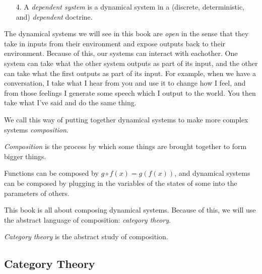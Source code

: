 \documentclass[DynamicalBook]{subfiles}
\begin{document}
\begin{enumerate}
  \item[4.] A \emph{dependent system} is a dynamical system in a
    (discrete, deterministic, and) \emph{dependent} doctrine.
\end{enumerate}

The dynamical systems we will see in this book are \emph{open} in the sense that
they take in inputs from their environment and expose outputs back to their
environment. Because of this, our systems can interact with eachother. One
system can take what the other system outputs as part of its input, and the
other can take what the first outputs as part of its input. For example, when we
have a conversation, I take what I hear from you and use it to change how I
feel, and from those feelings I generate some speech which I output to the
world. You then take what I've said and do the same thing.

\begin{center}
\end{center}

We call this way of putting together dynamical systems to make more complex
systems \emph{composition}.
\begin{informal}
  \emph{Composition} is the process by which some things are brought together to
  form bigger things.
\end{informal}

Functions can be composed by $g \circ f(x) = g(f(x))$, and dynamical systems
can be composed by plugging in the variables of the states of some into the
parameters of others.
  
This book is all about composing dynamical systems. Because of this, we will use
the abstract language of composition: \emph{category theory}.
\begin{informal}
\emph{Category theory} is the abstract study of composition.
\end{informal}




\subsection{Category Theory}
\end{document}
